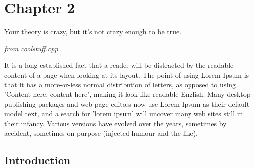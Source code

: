 \chapter{Chapter 2}
\addtocounter{footnote}{-1}  %
\thispagestyle{noheadrule}
\markboth{}{}
\label{ch:chapter2}

\pgfmathsetmacro\chapclr{\colourarray[2]}
\hypersetup{
citecolor  = \chapclr,
linkcolor  = \chapclr,
urlcolor   = \chapclr,
}

\epigraph{
Your theory is crazy, but it's not crazy enough to be true.
}{
  \textit{from coolstuff.cpp} \\
}


\begin{center}
    \begin{minipage}{\abstractwidth\textwidth}
      \begin{small}
        It is a long established fact that a reader will be distracted by the readable content of a page when looking at its layout.
        The point of using Lorem Ipsum is that it has a more-or-less normal distribution of letters, as opposed to using 'Content here, content here', making it look like readable English.
        Many desktop publishing packages and web page editors now use Lorem Ipsum as their default model text, and a search for 'lorem ipsum' will uncover many web sites still in their infancy.
        Various versions have evolved over the years, sometimes by accident, sometimes on purpose (injected humour and the like).
      \end{small}
    \end{minipage}
    \vspace{0.5cm}
\end{center}
\clearpage

\section{Introduction}

